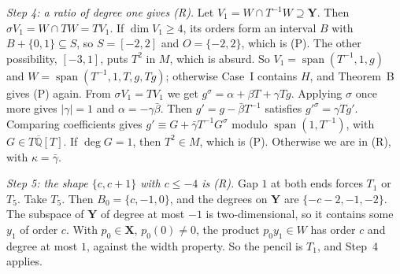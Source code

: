 \documentclass[11pt,a4paper]{article}
\theoremstyle{plain}
\theoremstyle{definition}
\newcommand{\Qbar}{\overline{\mathbb{Q}}}
\newcommand{\spn}{\operatorname{span}}
\begin{document}
\emph{Step 4: a ratio of degree one gives (R).} Let $V_{1}=W\cap T^{-1}W\supseteq\mathbf Y$.
Then $\sigma V_{1}=W\cap TW=TV_{1}$. If $\dim V_{1}\ge4$, its orders form an interval
$B$ with $B+\{0,1\}\subseteq S$, so $S=[-2,2]$ and $O=\{-2,2\}$, which is (P). The other
possibility, $[-3,1]$, puts $T^{2}$ in $M$, which is absurd. So $V_{1}=\spn(T^{-1},1,g)$
and $W=\spn(T^{-1},1,T,g,Tg)$; otherwise Case~I contains $H$, and Theorem~B gives (P)
again. From $\sigma V_{1}=TV_{1}$ we get $g^{\sigma}=\alpha+\beta T+\gamma Tg$. Applying
$\sigma$ once more gives $|\gamma|=1$ and $\alpha=-\gamma\bar\beta$. Then
$g'=g-\bar\beta T^{-1}$ satisfies $g'^{\sigma}=\gamma Tg'$. Comparing coefficients gives
$g'\equiv G+\bar\gamma T^{-1}G^{\sigma}$ modulo $\spn(1,T^{-1})$, with $G\in T\Qbar[T]$. If
$\deg G=1$, then $T^{2}\in M$, which is (P). Otherwise we are in (R), with $\kappa=\bar\gamma$.

\emph{Step 5: the shape $\{c,c+1\}$ with $c\le-4$ is (R).} Gap $1$ at both ends forces
$T_{1}$ or $T_{5}$. Take $T_{5}$. Then $B_{0}=\{c,-1,0\}$, and the degrees on $\mathbf Y$ are
$\{-c-2,-1,-2\}$. The subspace of $\mathbf Y$ of degree at most $-1$ is two-dimensional,
so it contains some $y_{1}$ of order $c$. With $p_{0}\in\mathbf X$, $p_{0}(0)\neq0$, the
product $p_{0}y_{1}\in W$ has order $c$ and degree at most $1$, against the width property.
So the pencil is $T_{1}$, and Step~4 applies.
\end{document}
